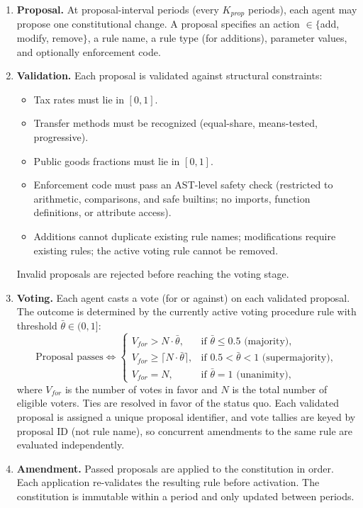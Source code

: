 \documentclass[12pt]{article}
\begin{document}
\begin{enumerate}[label=\textit{Stage \arabic*.}]
  \item \textbf{Proposal.} At proposal-interval periods (every $K_{prop}$ periods), each agent may propose one constitutional change. A proposal specifies an action $\in \{$add, modify, remove$\}$, a rule name, a rule type (for additions), parameter values, and optionally enforcement code.

  \item \textbf{Validation.} Each proposal is validated against structural constraints:
  \begin{itemize}
    \item Tax rates must lie in $[0, 1]$.
    \item Transfer methods must be recognized (equal-share, means-tested, progressive).
    \item Public goods fractions must lie in $[0, 1]$.
    \item Enforcement code must pass an AST-level safety check (restricted to arithmetic, comparisons, and safe builtins; no imports, function definitions, or attribute access).
    \item Additions cannot duplicate existing rule names; modifications require existing rules; the active voting rule cannot be removed.
  \end{itemize}
  Invalid proposals are rejected before reaching the voting stage.

  \item \textbf{Voting.} Each agent casts a vote (for or against) on each validated proposal. The outcome is determined by the currently active voting procedure rule with threshold $\bar{\theta} \in (0, 1]$:
  \begin{equation}\label{eq:voting}
    \text{Proposal passes} \iff
    \begin{cases}
      V_{for} > N \cdot \bar{\theta}, & \text{if } \bar{\theta} \leq 0.5 \text{ (majority)}, \\[4pt]
      V_{for} \geq \lceil N \cdot \bar{\theta} \rceil, & \text{if } 0.5 < \bar{\theta} < 1 \text{ (supermajority)}, \\[4pt]
      V_{for} = N, & \text{if } \bar{\theta} = 1 \text{ (unanimity)},
    \end{cases}
  \end{equation}
  where $V_{for}$ is the number of votes in favor and $N$ is the total number of eligible voters. Ties are resolved in favor of the status quo.
  Each validated proposal is assigned a unique proposal identifier, and vote tallies are keyed by proposal ID (not rule name), so concurrent amendments to the same rule are evaluated independently.

  \item \textbf{Amendment.} Passed proposals are applied to the constitution in order. Each application re-validates the resulting rule before activation. The constitution is immutable within a period and only updated between periods.
\end{enumerate}
\end{document}
